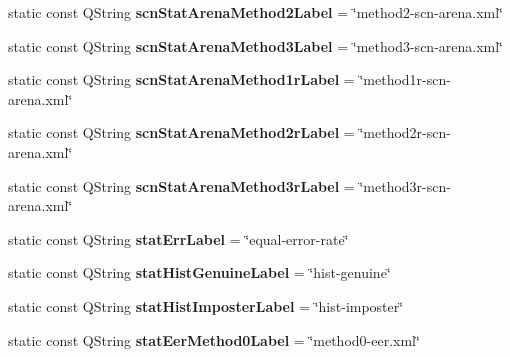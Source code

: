 \begin{DoxyCompactItemize}
\item 
\hypertarget{class_common_a778c1baf600ca4f7d94664545435316c}{static const Q\+String {\bfseries scn\+Stat\+Arena\+Method2\+Label} = \char`\"{}method2-\/scn-\/arena.\+xml\char`\"{}}\label{class_common_a778c1baf600ca4f7d94664545435316c}

\item 
\hypertarget{class_common_a2deadd2e4be4c271a3eb6991858158af}{static const Q\+String {\bfseries scn\+Stat\+Arena\+Method3\+Label} = \char`\"{}method3-\/scn-\/arena.\+xml\char`\"{}}\label{class_common_a2deadd2e4be4c271a3eb6991858158af}

\item 
\hypertarget{class_common_a27c3e97ec2e36bf419b9f8fc96f1431b}{static const Q\+String {\bfseries scn\+Stat\+Arena\+Method1r\+Label} = \char`\"{}method1r-\/scn-\/arena.\+xml\char`\"{}}\label{class_common_a27c3e97ec2e36bf419b9f8fc96f1431b}

\item 
\hypertarget{class_common_a837933b85649272717cbc36531f83ceb}{static const Q\+String {\bfseries scn\+Stat\+Arena\+Method2r\+Label} = \char`\"{}method2r-\/scn-\/arena.\+xml\char`\"{}}\label{class_common_a837933b85649272717cbc36531f83ceb}

\item 
\hypertarget{class_common_ad339aadce5135547832ee2983df5c3c4}{static const Q\+String {\bfseries scn\+Stat\+Arena\+Method3r\+Label} = \char`\"{}method3r-\/scn-\/arena.\+xml\char`\"{}}\label{class_common_ad339aadce5135547832ee2983df5c3c4}

\item 
\hypertarget{class_common_afd14b773324fe258d54b58ecaef2e69e}{static const Q\+String {\bfseries stat\+Err\+Label} = \char`\"{}equal-\/error-\/rate\char`\"{}}\label{class_common_afd14b773324fe258d54b58ecaef2e69e}

\item 
\hypertarget{class_common_aca6929f4bf648ae1e7fc5dfb6833ccf8}{static const Q\+String {\bfseries stat\+Hist\+Genuine\+Label} = \char`\"{}hist-\/genuine\char`\"{}}\label{class_common_aca6929f4bf648ae1e7fc5dfb6833ccf8}

\item 
\hypertarget{class_common_ac11cdb361710a15b652afbff5efff012}{static const Q\+String {\bfseries stat\+Hist\+Imposter\+Label} = \char`\"{}hist-\/imposter\char`\"{}}\label{class_common_ac11cdb361710a15b652afbff5efff012}

\item 
\hypertarget{class_common_a104773b87000251dd949cc227e8d2988}{static const Q\+String {\bfseries stat\+Eer\+Method0\+Label} = \char`\"{}method0-\/eer.\+xml\char`\"{}}\label{class_common_a104773b87000251dd949cc227e8d2988}


\end{DoxyCompactItemize}
